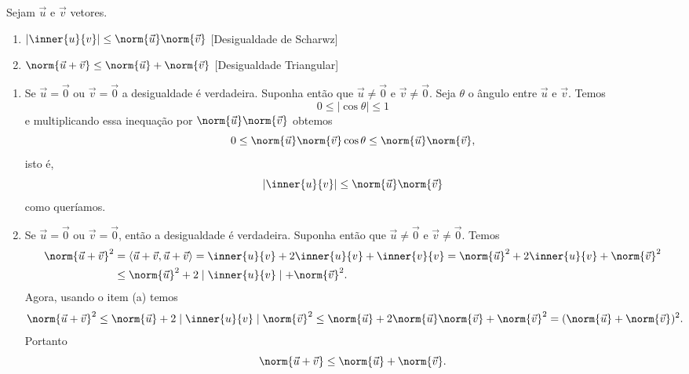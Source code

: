 \begin{proposicao}\label{DesigualdadeTriangular}
  Sejam $\vec{u}$ e $\vec{v}$ vetores.
  \begin{enumerate}
    \item $|\inner{u}{v}| \le \norm{\vec{u}}\norm{\vec{v}}$ [Desigualdade de Scharwz]
    \item $\norm{\vec{u} + \vec{v}} \le \norm{\vec{u}} + \norm{\vec{v}}$ [Desigualdade Triangular]
  \end{enumerate}
\end{proposicao}
\begin{prova}
  \begin{enumerate}
    \item Se $\vec{u} = \vec{0}$ ou $\vec{v} = \vec{0}$ a desigualdade é verdadeira. Suponha então que $\vec{u} \ne \vec{0}$ e $\vec{v} \ne \vec{0}$. Seja $\theta$ o ângulo entre $\vec{u}$ e $\vec{v}$. Temos
    \[
      0 \le |\cos\theta| \le 1
    \]
    e multiplicando essa inequação por $\norm{\vec{u}}\norm{\vec{v}}$ obtemos
    \[
      0 \le \norm{\vec{u}}\norm{\vec{v}}\cos\theta \le \norm{\vec{u}}\norm{\vec{v}},
    \]
    isto é,
    \[
      |\inner{u}{v}| \le \norm{\vec{u}}\norm{\vec{v}}
    \]
    como queríamos.
    \item Se $\vec{u} = \vec{0}$ ou $\vec{v} = \vec{0}$, então a desigualdade é verdadeira. Suponha então que $\vec{u} \ne \vec{0}$ e $\vec{v} \ne \vec{0}$. Temos
    \begin{align*}
      \norm{\vec{u} + \vec{v}}^2 &= \langle\vec{u} + \vec{v}, \vec{u} + \vec{v}\rangle = \inner{u}{v} + 2\inner{u}{v} + \inner{v}{v} = \norm{\vec{u}}^2 + 2\inner{u}{v} + \norm{\vec{v}}^2 \\ &\le \norm{\vec{u}}^2 + 2\mid\inner{u}{v}\mid + \norm{\vec{v}}^2.
    \end{align*}
    Agora, usando o item (a) temos
    \begin{align*}
      \norm{\vec{u} + \vec{v}}^2 \le \norm{\vec{u}} + 2\mid\inner{u}{v}\mid \norm{\vec{v}}^2 \le \norm{\vec{u}} + 2\norm{\vec{u}}\norm{\vec{v}} + \norm{\vec{v}}^2 = (\norm{\vec{u}} + \norm{\vec{v}})^2.
    \end{align*}
    Portanto
    \[
      \norm{\vec{u} + \vec{v}} \le \norm{\vec{u}} + \norm{\vec{v}}.
    \]
  \end{enumerate}
\end{prova}

